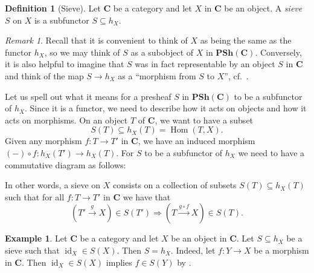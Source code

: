 \documentclass[12pt,reqno,a4paper]{amsart}
\theoremstyle{plain}
\theoremstyle{definition}
\newtheorem{defn}[thm]{Definition}
\newtheorem{exmp}[thm]{Example}
\theoremstyle{remark}
\newtheorem{rem}[thm]{Remark}
\begin{document}
\begin{defn}[Sieve]
  Let $\mathbf{C}$ be a category and let $X$ in $\mathbf{C}$ be an object.
  A \textit{sieve} $S$ on $X$ is a subfunctor $S \subseteq h_{X}$.
\end{defn}

\begin{rem}
  Recall that it is convenient to think of $X$ as being the same as the functor $h_{X}$, so we may think of $S$ as a subobject of $X$ in $\mathbf{PSh}(\mathbf{C})$.
  Conversely, it is also helpful to imagine that $S$ was in fact representable by an object $S$ in $\mathbf{C}$ and think of the map $S \to h_{X}$ as a ``morphism from $S$ to $X$'', cf.~\cite[\href{https://stacks.math.columbia.edu/tag/00YW}{Tag 00YW}]{stacks-project}.
\end{rem}

Let us spell out what it means for a presheaf $S$ in $\mathbf{PSh}(\mathbf{C})$ to be a subfunctor of $h_{X}$.
Since it is a functor, we need to describe how it acts on objects and how it acts on morphisms.
On an object $T$ of $\mathbf{C}$, we want to have a subset
\[ S(T) \subseteq h_{X}(T) = \operatorname{Hom}(T,X). \]
Given any morphism $f \colon T \to T'$ in $\mathbf{C}$, we have an induced morphism $(-) \circ f \colon h_{X}(T') \to h_{X}(T)$.
For $S$ to be a subfunctor of $h_{X}$ we need to have a commutative diagram as follows:
\begin{center}
\end{center}

In other words, a sieve on $X$ consists on a collection of subsets $S(T) \subseteq h_{X}(T)$ such that for all $f \colon T \to T'$ in $\mathbf{C}$ we have that
\begin{equation}\label{eqn:sieve}
  (T' \xrightarrow{g} X) \in S(T') \Rightarrow (T \xrightarrow{g \circ f} X) \in S(T).
\end{equation}

\begin{exmp}\label{exmp:maximalsieve}
  Let $\mathbf{C}$ be a category and let $X$ be an object in $\mathbf{C}$.
  Let $S \subseteq h_{X}$ be a sieve such that $\operatorname{id}_{X} \in S(X)$.
  Then $S = h_{X}$.
  Indeed, let $f \colon Y \to X$ be a morphism in $\mathbf{C}$.
  Then $\operatorname{id}_{X} \in S(X)$ implies $f \in S(Y)$ by .
\end{exmp}
\end{document}

